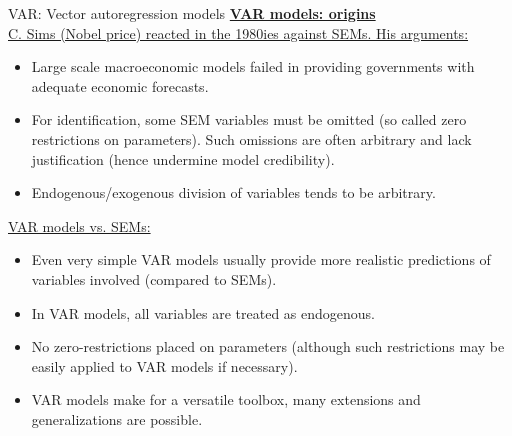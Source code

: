 \documentclass[usenames,dvipsnames]{beamer}
\begin{document}
\begin{frame}{VAR: Vector autoregression models}
\footnotesize
\underline{\textbf{VAR models: origins}} \\
\medskip
\underline{C. Sims (Nobel price) reacted in the 1980ies against SEMs. His arguments:}\\
\begin{itemize}
\item Large scale macroeconomic models failed in providing governments with adequate economic forecasts.
\item For identification, some SEM variables must be omitted (so called zero restrictions on parameters). Such omissions are often arbitrary and lack justification (hence undermine model credibility).
\item Endogenous/exogenous division of variables tends to be arbitrary. 
\end{itemize}
\underline{VAR models vs. SEMs:}\\
\begin{itemize}
\item Even very simple VAR models usually provide more realistic predictions of variables involved (compared to SEMs).
\item In VAR models, all variables are treated as endogenous.
\item No zero-restrictions placed on parameters (although such restrictions may be easily applied to VAR models if necessary). 
\item VAR models make for a versatile toolbox, many extensions and generalizations are possible.
\end{itemize}
\end{frame}
\end{document}

